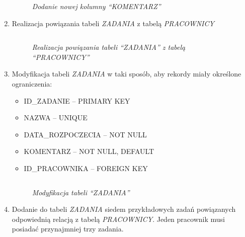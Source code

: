 \documentclass{article}
\begin{document}
\begin{enumerate}
\begin{lstlisting}[style=SQL,caption=\textit{Dodanie nowej kolumny ``KOMENTARZ''}]
\end{lstlisting}

\begin{figure}[H]
	\centering
	\caption{\textit{Dodanie nowej kolumny ``KOMENTARZ''}}
\end{figure}

\item Realizacja powiązania tabeli \emph{ZADANIA} z tabelą \emph{PRACOWNICY}

\begin{lstlisting}[style=SQL,caption=\textit{Realizacja powiązania tabeli ``ZADANIA'' z tabelą ``PRACOWNICY''}]
\end{lstlisting}

\begin{figure}[H]
	\centering
	\caption{\textit{Realizacja powiązania tabeli ``ZADANIA'' z tabelą ``PRACOWNICY''}}
\end{figure}

\item Modyfikacja tabeli \emph{ZADANIA} w taki sposób, aby rekordy miały określone ograniczenia:
\begin{itemize}
\item ID\_ZADANIE -- PRIMARY KEY
\item NAZWA -- UNIQUE
\item DATA\_ROZPOCZECIA -- NOT NULL
\item KOMENTARZ -- NOT NULL, DEFAULT
\item ID\_PRACOWNIKA -- FOREIGN KEY
\end{itemize}

\begin{lstlisting}[style=SQL, caption=\textit{Modyfikacja tabeli ``ZADANIA''}]
\end{lstlisting}

\begin{figure}[H]
	\centering
	\caption{\textit{Modyfikacja tabeli ``ZADANIA''}}
\end{figure}

\item Dodanie do tabeli \emph{ZADANIA} siedem przykładowych zadań powiązanych odpowiednią relacją z tabelą \emph{PRACOWNICY}. Jeden pracownik musi posiadać przynajmniej trzy zadania.

\begin{lstlisting}[style=SQL, caption=\textit{Dodanie do tabeli ``ZADANIA''}]
\end{lstlisting}


\end{enumerate}
\end{document}
